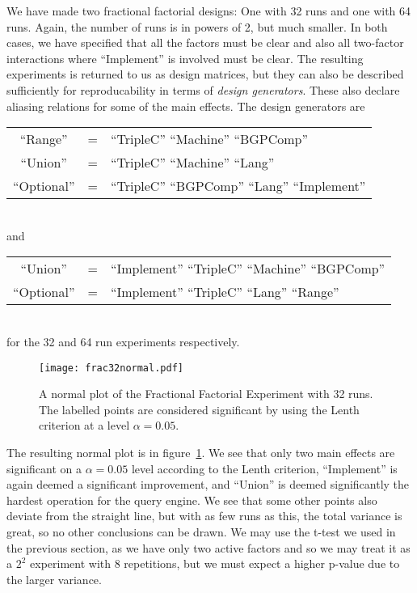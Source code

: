 \documentclass{llncs}
\begin{document}
We have made two fractional factorial designs: One with 32 runs and
one with 64 runs. Again, the number of runs is in powers of 2, but
much smaller. In both cases, we have specified that all the factors
must be clear and also all two-factor interactions where ``Implement''
is involved must be clear. The resulting experiments is returned to us
as design matrices, but they can also be described sufficiently for
reproducability in terms of \emph{design generators}. These also
declare aliasing relations for some of the main effects. The design
generators are\\
\begin{tabular}{ccl}
``Range'' &=& ``TripleC'' ``Machine'' ``BGPComp'' \\  
``Union'' &=& ``TripleC'' ``Machine'' ``Lang'' \\  
``Optional'' &=& ``TripleC'' ``BGPComp'' ``Lang'' ``Implement'' 
\end{tabular}
\\and\\
\begin{tabular}{ccl}
``Union'' &=& ``Implement''  ``TripleC''  ``Machine'' ``BGPComp'' \\
``Optional'' &=& ``Implement''  ``TripleC'' ``Lang''  ``Range'' 
\end{tabular}
\\for the 32 and 64 run experiments respectively.

\begin{figure}[h!]
  \texttt{[image: frac32normal.pdf]}
  \caption{A normal plot of the Fractional Factorial Experiment with
    32 runs. The labelled points are considered significant by using
    the Lenth criterion at a level
    $\alpha=0.05$.}\label{fig:frac32normal}
\end{figure}


The resulting normal plot is in figure~\ref{fig:frac32normal}. We see
that only two main effects are significant on a $\alpha = 0.05$ level
according to the Lenth criterion, ``Implement'' is again deemed a
significant improvement, and ``Union'' is deemed significantly the
hardest operation for the query engine. We see that some other points
also deviate from the straight line, but with as few runs as this, the
total variance is great, so no other conclusions can be drawn. We may
use the t-test we used in the previous section, as we have only two
active factors and so we may treat it as a $2^2$ experiment with 8
repetitions, but we must expect a higher p-value due to the larger
variance.
\end{document}
